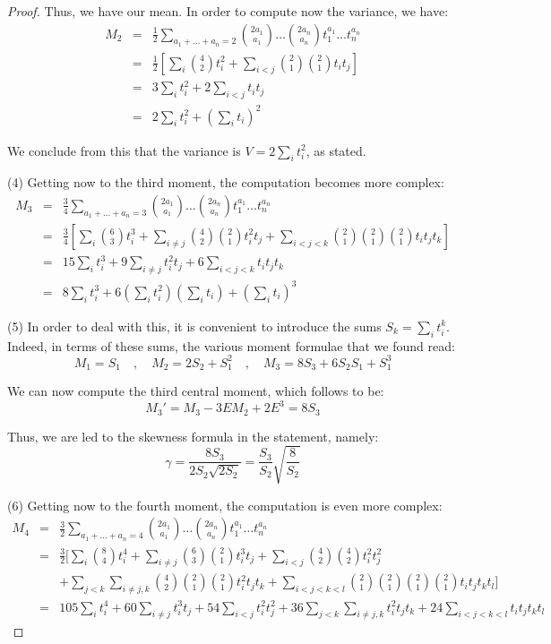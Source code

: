 \documentclass[12pt]{amsbook}
\begin{document}
\begin{proof}
Thus, we have our mean. In order to compute now the variance, we have:
\begin{eqnarray*}
M_2
&=&\frac{1}{2}\sum_{a_1+\ldots+a_n=2}\binom{2a_1}{a_1}\ldots\binom{2a_n}{a_n}t_1^{a_1}\ldots t_n^{a_n}\\
&=&\frac{1}{2}\left[\sum_i\binom{4}{2}t_i^2+\sum_{i<j}\binom{2}{1}\binom{2}{1}t_it_j\right]\\
&=&3\sum_it_i^2+2\sum_{i<j}t_it_j\\
&=&2\sum_it_i^2+\left(\sum_it_i\right)^2
\end{eqnarray*}

We conclude from this that the variance is $V=2\sum_it_i^2$, as stated.

\medskip

(4) Getting now to the third moment, the computation becomes more complex:
\begin{eqnarray*}
M_3
&=&\frac{3}{4}\sum_{a_1+\ldots+a_n=3}\binom{2a_1}{a_1}\ldots\binom{2a_n}{a_n}t_1^{a_1}\ldots t_n^{a_n}\\
&=&\frac{3}{4}\left[\sum_i\binom{6}{3}t_i^3+\sum_{i\neq j}\binom{4}{2}\binom{2}{1}t_i^2t_j+\sum_{i<j<k}\binom{2}{1}\binom{2}{1}\binom{2}{1}t_it_jt_k\right]\\
&=&15\sum_it_i^3+9\sum_{i\neq j}t_i^2t_j+6\sum_{i<j<k}t_it_jt_k\\
&=&8\sum_it_i^3+6\left(\sum_it_i^2\right)\left(\sum_it_i\right)+\left(\sum_it_i\right)^3
\end{eqnarray*}

(5) In order to deal with this, it is convenient to introduce the sums $S_k=\sum_it_i^k$. Indeed, in terms of these sums, the various moment formulae that we found read:
$$M_1=S_1\quad,\quad M_2=2S_2+S_1^2\quad,\quad M_3=8S_3+6S_2S_1+S_1^3$$

We can now compute the third central moment, which follows to be:
$$M_3'=M_3-3EM_2+2E^3=8S_3$$

Thus, we are led to the skewness formula in the statement, namely:
$$\gamma=\frac{8S_3}{2S_2\sqrt{2S_2}}=\frac{S_3}{S_2}\sqrt{\frac{8}{S_2}}$$

(6) Getting now to the fourth moment, the computation is even more complex:
\begin{eqnarray*}
M_4
&=&\frac{3}{2}\sum_{a_1+\ldots+a_n=4}\binom{2a_1}{a_1}\ldots\binom{2a_n}{a_n}t_1^{a_1}\ldots t_n^{a_n}\\
&=&\frac{3}{2}\Big[\sum_i\binom{8}{4}t_i^4+\sum_{i\neq j}\binom{6}{3}\binom{2}{1}t_i^3t_j+\sum_{i<j}\binom{4}{2}\binom{4}{2}t_i^2t_j^2\\
&&+\sum_{j<k}\sum_{i\neq j,k}\binom{4}{2}\binom{2}{1}\binom{2}{1}t_i^2t_jt_k+\sum_{i<j<k<l}\binom{2}{1}\binom{2}{1}\binom{2}{1}\binom{2}{1}t_it_jt_kt_l\Big]\\
&=&105\sum_it_i^4+60\sum_{i\neq j}t_i^3t_j+54\sum_{i<j}t_i^2t_j^2+36\sum_{j<k}\sum_{i\neq j,k}t_i^2t_jt_k+24\sum_{i<j<k<l}t_it_jt_kt_l
\end{eqnarray*}


\end{proof}
\end{document}
